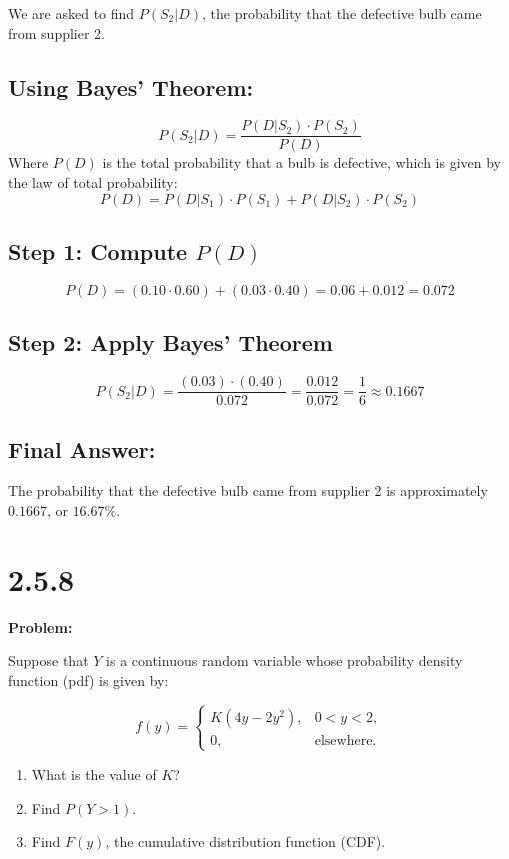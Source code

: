 \documentclass{article}
\begin{document}
We are asked to find \( P(S_2|D) \), the probability that the defective bulb came from supplier 2.

\subsection*{Using Bayes' Theorem:}

\[
P(S_2|D) = \frac{P(D|S_2) \cdot P(S_2)}{P(D)}
\]
Where \( P(D) \) is the total probability that a bulb is defective, which is given by the law of total probability:
\[
P(D) = P(D|S_1) \cdot P(S_1) + P(D|S_2) \cdot P(S_2)
\]

\subsection*{Step 1: Compute \( P(D) \)}

\[
P(D) = (0.10 \cdot 0.60) + (0.03 \cdot 0.40) = 0.06 + 0.012 = 0.072
\]

\subsection*{Step 2: Apply Bayes' Theorem}

\[
P(S_2|D) = \frac{(0.03) \cdot (0.40)}{0.072} = \frac{0.012}{0.072} = \frac{1}{6} \approx 0.1667
\]

\subsection*{Final Answer:}

The probability that the defective bulb came from supplier 2 is approximately \( 0.1667 \), or \( 16.67\% \).


\section*{2.5.8}

\textbf{Problem:}

Suppose that \( Y \) is a continuous random variable whose probability density function (pdf) is given by:

\[
f(y) = 
\begin{cases} 
K(4y - 2y^2), & 0 < y < 2, \\
0, & \text{elsewhere}.
\end{cases}
\]

\begin{enumerate}
    \item[(a)] What is the value of \( K \)?
    \item[(b)] Find \( P(Y > 1) \).
    \item[(c)] Find \( F(y) \), the cumulative distribution function (CDF).
\end{enumerate}
\end{document}
